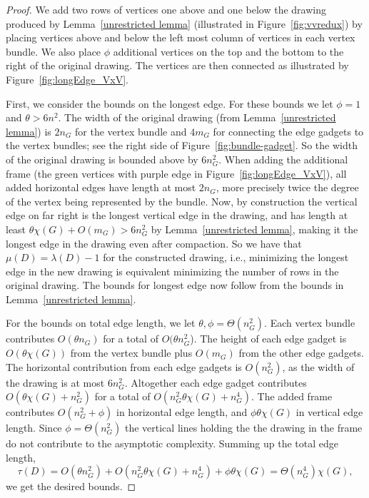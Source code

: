\documentclass[12pt]{article}
\theoremstyle{definitions}
\begin{document}
\begin{proof}
We add two rows of vertices one above and one below the drawing produced by
Lemma~\ref{unrestricted lemma} (illustrated in Figure~\ref{fig:vvredux}) by
placing vertices above and below the left most column of vertices in each vertex bundle.
We also place $\phi$ additional vertices on the top and the bottom to the right of the original drawing. The vertices are then connected as illustrated by Figure~\ref{fig:longEdge_VxV}.

First, we consider the bounds on the longest edge. For these bounds we let $\phi = 1$ and $\theta > 6n^2$. The width of the original drawing (from Lemma~\ref{unrestricted lemma}) is $2n_G$ for the vertex bundle and $4m_G$ for connecting the edge gadgets to the vertex bundles; see the right side of Figure~\ref{fig:bundle-gadget}. So the width of the original drawing is bounded above by $6n_G^2$. When adding the additional frame (the green vertices with purple edge in Figure~\ref{fig:longEdge_VxV}), all added horizontal edges have length at most $2n_G$, more precisely twice the degree of the vertex being represented by the bundle. Now, by construction the vertical edge on far right is the longest vertical edge in the drawing, and has length at least
\(
\theta \chi(G) + O(m_G) > 6n_G^2
\)
by Lemma~\ref{unrestricted lemma}, making it the longest edge in the drawing even after compaction. So we have that $\mu(D) = \lambda(D) - 1$ for the constructed drawing, i.e., minimizing the longest edge in the new drawing is equivalent minimizing the number of rows in the original drawing. The bounds for longest edge now follow from the bounds in Lemma~\ref{unrestricted lemma}.

For the bounds on total edge length, we let $\theta, \phi = \Theta(n_G^2)$. Each vertex bundle contributes $O(\theta n_G)$ for a total of $O(\theta n_G^2$). The height of each edge gadget is $O(\theta \chi(G))$ from the vertex bundle plus $O(m_G)$ from the other edge gadgets. The horizontal contribution from each edge gadgets is $O(n_G^2)$, as the width of the drawing is at most $6n_G^2$. Altogether each edge gadget contributes $O(\theta\chi(G) + n_G^2)$ for a total of $O(n_G^2 \theta \chi(G) + n_G^4)$. The added frame contributes $O(n_G^2 + \phi)$ in horizontal edge length, and $\phi\theta\chi(G)$ in vertical edge length. Since $\phi = \Theta(n_G^2)$ the vertical lines holding the the drawing in the frame do not contribute to the asymptotic complexity. Summing up the total edge length,
\[
\tau(D) = O(\theta n_G^2) + O(n_G^2\theta \chi(G) + n_G^4) + \phi\theta\chi(G) = \Theta(n_G^4) \chi(G),
\]
we get the desired bounds.
\end{proof}
\end{document}
